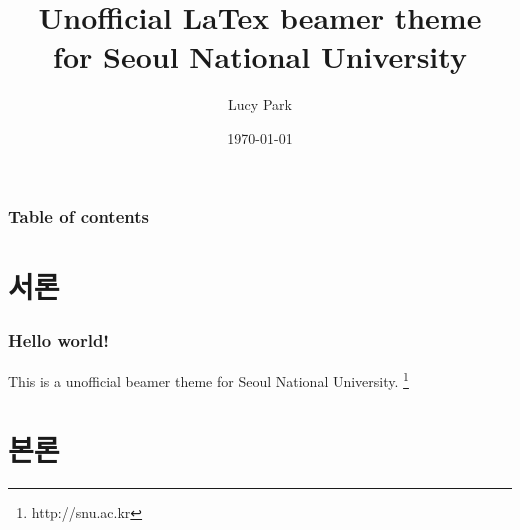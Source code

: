 \documentclass[compress]{beamer}
\begin{document}
\title{Unofficial LaTex beamer theme \\for Seoul National University}
\author{Lucy Park}
\date{\today}

{
\begin{frame}[plain]
  \titlepage
\end{frame}
}


\begin{frame}\frametitle{Table of contents}
    \tableofcontents
\end{frame}


\section{서론}
\begin{frame}\frametitle{Hello world!}
    This is a unofficial beamer theme for Seoul National University.
    \footnote{http://snu.ac.kr}
\end{frame}


\section{본론}
\end{document}

